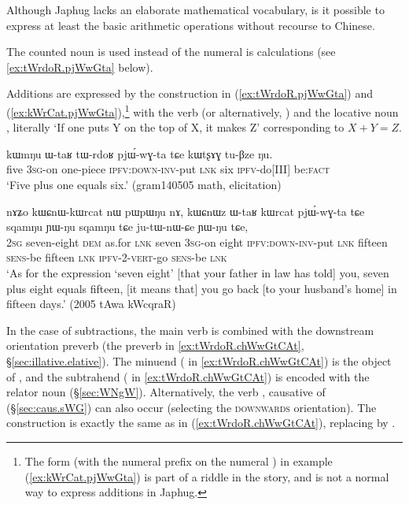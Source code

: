 Although Japhug lacks an elaborate mathematical vocabulary, is it possible to express at least the basic arithmetic operations without recourse to Chinese. 

The counted noun  is used instead of the numeral  is calculations (see \ref{ex:tWrdoR.pjWwGta} below).

Additions are expressed by the construction in (\ref{ex:tWrdoR.pjWwGta}) and (\ref{ex:kWrCat.pjWwGta}),\footnote{The form  (with the numeral prefix  on the numeral ) in example (\ref{ex:kWrCat.pjWwGta}) is part of a riddle in the story, and is not a normal way to express additions in Japhug. } with the verb  (or alternatively, ) and the locative noun , literally  `If one puts Y on the top of X, it makes Z' corresponding to $X+Y=Z$.  

\begin{exe}
\ex \label{ex:tWrdoR.pjWwGta}
\gll kɯmŋu ɯ-taʁ tɯ-rdoʁ pjɯ́-wɣ-ta tɕe kɯtʂɤɣ tu-βze ŋu.  \\
 five \textsc{3sg}-on one-piece \textsc{ipfv}:\textsc{down}-\textsc{inv}-put \textsc{lnk} six \textsc{ipfv}-do[III] be:\textsc{fact} \\
\glt `Five plus one equals six.' (gram140505 math, elicitation)
\end{exe}

 

\begin{exe}
\ex \label{ex:kWrCat.pjWwGta}
\gll  nɤʑo kɯɕnɯ-kɯrcat nɯ pɯpɯŋu nɤ, kɯɕnɯz ɯ-taʁ kɯrcat pjɯ́-wɣ-ta tɕe sqamŋu ɲɯ-ŋu sqamŋu tɕe ju-tɯ-nɯ-ɕe ɲɯ-ŋu tɕe, \\
 \textsc{2sg} seven-eight \textsc{dem} as.for \textsc{lnk} seven  \textsc{3sg}-on eight \textsc{ipfv}:\textsc{down}-\textsc{inv}-put \textsc{lnk}  fifteen   \textsc{sens}-be fifteen \textsc{lnk} \textsc{ipfv}-2-\textsc{vert}-go \textsc{sens}-be \textsc{lnk} \\
\glt `As for the expression `seven eight' [that your father in law has told] you, seven plus eight equals fifteen, [it means that] you go back [to your husband's home] in fifteen days.' (2005 tAwa kWcqraR)
\end{exe}
  
 
In the case of subtractions, the  main verb is   combined with the downstream orientation preverb  (the preverb  in \ref{ex:tWrdoR.chWwGtCAt}, §\ref{sec:illative.elative}).  The minuend ( in \ref{ex:tWrdoR.chWwGtCAt}) is the object of , and the subtrahend  ( in \ref{ex:tWrdoR.chWwGtCAt}) is encoded with the relator noun  (§\ref{sec:WNgW}). Alternatively, the verb , causative of  (§\ref{sec:caus.sWG}) can also occur (selecting the \textsc{downwards} orientation). The construction is exactly the same as in (\ref{ex:tWrdoR.chWwGtCAt}), replacing   by  .

